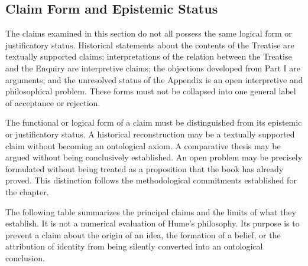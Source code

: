 
\subsection{Claim Form and Epistemic Status}
\label{subsec:ch08-hume-status}

\label{para:VS.B01.P01.C08.S09.SS14.P001}

The claims examined in this section do not all
possess the same logical form or justificatory
status. Historical statements about the contents
of the Treatise are textually supported claims;
interpretations of the relation between the
Treatise and the Enquiry are interpretive claims;
the objections developed from Part I are
arguments; and the unresolved status of the
Appendix is an open interpretive and philosophical
problem. These forms must not be collapsed into
one general label of acceptance or rejection.

\label{para:VS.B01.P01.C08.S09.SS14.P002}

The functional or logical form of a claim must
be distinguished from its epistemic or justificatory
status. A historical reconstruction may be a
textually supported claim without becoming an
ontological axiom. A comparative thesis may be
argued without being conclusively established.
An open problem may be precisely formulated
without being treated as a proposition that
the book has already proved. This distinction
follows the methodological commitments established
for the chapter.

\label{para:VS.B01.P01.C08.S09.SS14.P003}

The following table summarizes the principal
claims and the limits of what they establish.
It is not a numerical evaluation of Hume's
philosophy. Its purpose is to prevent a claim
about the origin of an idea, the formation
of a belief, or the attribution of identity
from being silently converted into an ontological
conclusion.

\begin{center}

\end{center}

